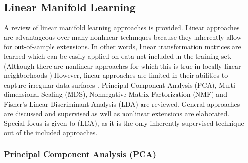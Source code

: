 \subsection{Linear Manifold Learning}
A review of linear manifold learning approaches is provided.  Linear approaches are advantageous over many nonlinear techniques because they inherently allow for out-of-sample extensions.  In other words, linear transformation matrices are learned which can be easily applied on data not included in the training set. (Although there are nonlinear approaches for which this is true in locally linear neighborhoods \citep{Roweis2000LLE}) However, linear approaches are limited in their abilities to capture irregular data surfaces \citep{Kegl2008PrincipalManifoldsTextbook}.  Principal Component Analysis (PCA), Multi-dimensional Scaling (MDS), Nonnegative Matrix Factorization (NMF) and Fisher's Linear Discriminant Analysis (LDA) are reviewed.  General approaches are discussed and supervised as well as nonlinear extensions are elaborated. Special focus is given to (LDA), as it is the only inherently supervised technique out of the included approaches.

\subsubsection{Principal Component Analysis (PCA)} \label{sec:PCA}

